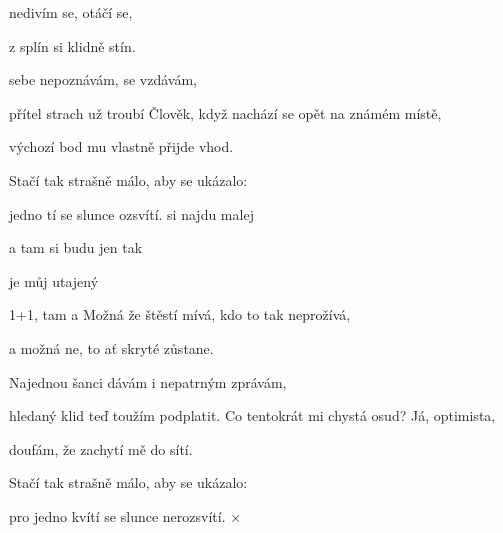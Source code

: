 
\zs
{} nedivím se,  otáčí se,

z  splín si klidně  stín.

 sebe nepoznávám,  se vzdávám,

 přítel strach už troubí 
\ks
\zs
Člověk, když nachází se opět na známém místě,

výchozí bod mu vlastně přijde vhod.

Stačí tak strašně málo, aby se ukázalo:

 jedno tí se slunce ozsvítí.
\ks
\zr
{} si najdu malej 

a tam si budu jen tak  

 je můj utajený 

1+1, tam a  
\kr
\zs
Možná že štěstí mívá, kdo to tak neprožívá,

a možná ne, to ať skryté zůstane.

Najednou šanci dávám i nepatrným zprávám,

hledaný klid teď toužím podplatit.
\ks
\zs
Co tentokrát mi chystá osud? Já, optimista,

doufám, že zachytí mě do sítí.

Stačí tak strašně málo, aby se ukázalo:

pro jedno kvítí se slunce nerozsvítí.
\ks
{}×
\kr
\kp



